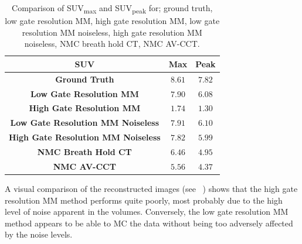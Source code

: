     \begin{table}
        \centering
        
        \captionsetup{singlelinecheck=false, justification=centering}
        \caption{Comparison of \gls{SUV}\textsubscript{max} and \gls{SUV}\textsubscript{peak} for; ground truth, low gate resolution \gls{MM}, high gate resolution \gls{MM}, low gate resolution \gls{MM} noiseless, high gate resolution \gls{MM} noiseless, \gls{NMC} breath hold \gls{CT}, \gls{NMC} \gls{AV-CCT}.}
        
        \resizebox*{1.0\linewidth}{!}
        {
            \begin{tabular}{||c|cc||}
                \hline
                \textbf{\gls{SUV}}                                  & \textbf{Max}  & \textbf{Peak} \\
                \hline
                \textbf{Ground Truth}                               & $8.61$        & $7.82$ \\
                \hline
                \textbf{Low Gate Resolution \gls{MM}}               & $7.90$        & $6.08$ \\
                \textbf{High Gate Resolution \gls{MM}}              & $1.74$        & $1.30$ \\
                \hline
                \textbf{Low Gate Resolution \gls{MM} Noiseless}     & $7.91$        & $6.10$ \\
                \textbf{High Gate Resolution \gls{MM} Noiseless}    & $7.82$        & $5.99$ \\
                \hline
                \textbf{\gls{NMC} Breath Hold \gls{CT}}             & $6.46$        & $4.95$ \\
                \textbf{\gls{NMC} \gls{AV-CCT}}                     & $5.56$        & $4.37$ \\
                \hline
            \end{tabular}
        }
        \label{tab:suv}
        
    \end{table}
    
    A visual comparison of the reconstructed images (see ~) shows that the high gate resolution \gls{MM} method performs quite poorly, most probably due to the high level of noise apparent in the volumes. Conversely, the low gate resolution \gls{MM} method appears to be able to \gls{MC} the data without being too adversely affected by the noise levels.
     
